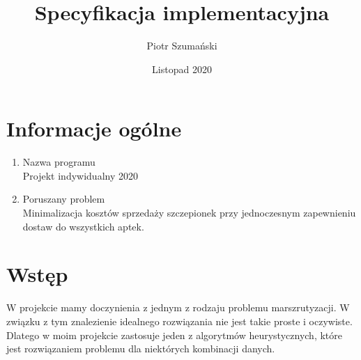 \documentclass{article}
\title{Specyfikacja implementacyjna}
\author{Piotr Szumański}
\date{Listopad 2020}
\begin{document}
\maketitle

\section{Informacje ogólne}
\begin{enumerate}
    \item Nazwa programu
    \\ Projekt indywidualny 2020
    \item Poruszany problem
    \\ Minimalizacja kosztów sprzedaży szczepionek przy jednoczesnym zapewnieniu dostaw do wszystkich aptek.
\end{enumerate}

\section{Wstęp}
W projekcie mamy doczynienia z jednym z rodzaju problemu marszrutyzacji. W związku z tym znalezienie idealnego rozwiązania nie jest takie proste i oczywiste. Dlatego w moim projekcie zastosuje jeden z algorytmów heurystycznych, które jest rozwiązaniem problemu dla niektórych kombinacji danych.
\end{document}
